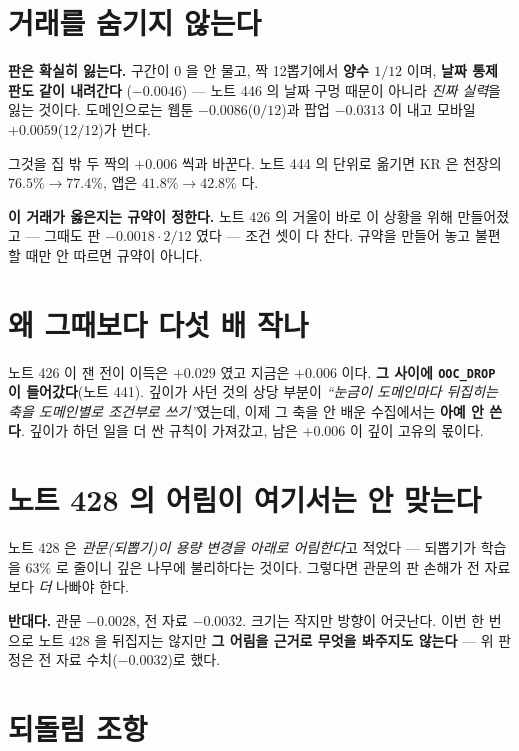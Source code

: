 \documentclass[11pt]{article}
\begin{document}
\section{거래를 숨기지 않는다}

\textbf{판은 확실히 잃는다.} 구간이 $0$ 을 안 물고, 짝 12뽑기에서
\textbf{양수 $1/12$} 이며, \textbf{날짜 통제 판도 같이 내려간다}
($-0.0046$) --- 노트 446 의 날짜 구멍 때문이 아니라 \emph{진짜 실력}을
잃는 것이다. 도메인으로는 웹툰 $-0.0086$($0/12$)과 팝업 $-0.0313$ 이
내고 모바일 $+0.0059$($12/12$)가 번다.

그것을 집 밖 두 짝의 $+0.006$ 씩과 바꾼다. 노트 444 의 단위로 옮기면
KR 은 천장의 $76.5\% \to 77.4\%$, 앱은 $41.8\% \to 42.8\%$ 다.

\textbf{이 거래가 옳은지는 규약이 정한다.} 노트 426 의 거울이 바로 이
상황을 위해 만들어졌고 --- 그때도 판 $-0.0018 \cdot 2/12$ 였다 ---
조건 셋이 다 찬다. 규약을 만들어 놓고 불편할 때만 안 따르면 규약이
아니다.

\section{왜 그때보다 다섯 배 작나}

노트 426 이 잰 전이 이득은 $+0.029$ 였고 지금은 $+0.006$ 이다.
\textbf{그 사이에 \texttt{OOC\_DROP} 이 들어갔다}(노트 441). 깊이가 사던
것의 상당 부분이 \emph{``눈금이 도메인마다 뒤집히는 축을 도메인별로
조건부로 쓰기''}였는데, 이제 그 축을 안 배운 수집에서는 \textbf{아예 안
쓴다}. 깊이가 하던 일을 더 싼 규칙이 가져갔고, 남은 $+0.006$ 이 깊이
고유의 몫이다.

\section{노트 428 의 어림이 여기서는 안 맞는다}

노트 428 은 \emph{관문(되뽑기)이 용량 변경을 아래로 어림한다}고 적었다
--- 되뽑기가 학습을 $63\%$ 로 줄이니 깊은 나무에 불리하다는 것이다.
그렇다면 관문의 판 손해가 전 자료보다 \emph{더} 나빠야 한다.

\textbf{반대다.} 관문 $-0.0028$, 전 자료 $-0.0032$. 크기는 작지만 방향이
어긋난다. 이번 한 번으로 노트 428 을 뒤집지는 않지만 \textbf{그 어림을
근거로 무엇을 봐주지도 않는다} --- 위 판정은 전 자료 수치($-0.0032$)로
했다.

\section*{되돌림 조항}
\end{document}
